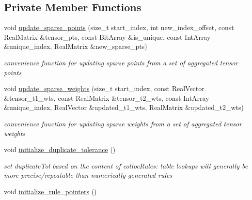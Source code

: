 \subsection*{Private Member Functions}
\begin{DoxyCompactItemize}
\item 
void \hyperlink{classPecos_1_1CombinedSparseGridDriver_a7480bf1f3fb2c3d37c3e90f397e5c7fd}{update\+\_\+sparse\+\_\+points} (size\+\_\+t start\+\_\+index, int new\+\_\+index\+\_\+offset, const Real\+Matrix \&tensor\+\_\+pts, const Bit\+Array \&is\+\_\+unique, const Int\+Array \&unique\+\_\+index, Real\+Matrix \&new\+\_\+sparse\+\_\+pts)\label{classPecos_1_1CombinedSparseGridDriver_a7480bf1f3fb2c3d37c3e90f397e5c7fd}

\begin{DoxyCompactList}\small\item\em convenience function for updating sparse points from a set of aggregated tensor points \end{DoxyCompactList}\item 
void \hyperlink{classPecos_1_1CombinedSparseGridDriver_adecce15386ed39c559f4db8f09a08c76}{update\+\_\+sparse\+\_\+weights} (size\+\_\+t start\+\_\+index, const Real\+Vector \&tensor\+\_\+t1\+\_\+wts, const Real\+Matrix \&tensor\+\_\+t2\+\_\+wts, const Int\+Array \&unique\+\_\+index, Real\+Vector \&updated\+\_\+t1\+\_\+wts, Real\+Matrix \&updated\+\_\+t2\+\_\+wts)\label{classPecos_1_1CombinedSparseGridDriver_adecce15386ed39c559f4db8f09a08c76}

\begin{DoxyCompactList}\small\item\em convenience function for updating sparse weights from a set of aggregated tensor weights \end{DoxyCompactList}\item 
void \hyperlink{classPecos_1_1CombinedSparseGridDriver_a4816b36ffde1cee6ae79cce69b1fca20}{initialize\+\_\+duplicate\+\_\+tolerance} ()\label{classPecos_1_1CombinedSparseGridDriver_a4816b36ffde1cee6ae79cce69b1fca20}

\begin{DoxyCompactList}\small\item\em set duplicate\+Tol based on the content of colloc\+Rules\+: table lookups will generally be more precise/repeatable than numerically-\/generated rules \end{DoxyCompactList}\item 
void \hyperlink{classPecos_1_1CombinedSparseGridDriver_a3d59b9fb53b300d676f0d92e960cd0da}{initialize\+\_\+rule\+\_\+pointers} ()\label{classPecos_1_1CombinedSparseGridDriver_a3d59b9fb53b300d676f0d92e960cd0da}


\end{DoxyCompactItemize}
